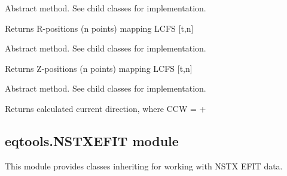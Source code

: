 \documentclass[letterpaper,10pt,english]{sphinxmanual}
\begin{document}
\begin{fulllineitems}
\begin{fulllineitems}
\end{fulllineitems}


\begin{fulllineitems}
\label{\detokenize{eqtools:eqtools.FromArrays.ArrayEquilibrium.getRLCFS}}
Abstract method.  See child classes for implementation.

Returns R-positions (n points) mapping LCFS {[}t,n{]}

\end{fulllineitems}


\begin{fulllineitems}
\label{\detokenize{eqtools:eqtools.FromArrays.ArrayEquilibrium.getZLCFS}}
Abstract method.  See child classes for implementation.

Returns Z-positions (n points) mapping LCFS {[}t,n{]}

\end{fulllineitems}


\begin{fulllineitems}
\label{\detokenize{eqtools:eqtools.FromArrays.ArrayEquilibrium.getCurrentSign}}
Abstract method.  See child classes for implementation.

Returns calculated current direction, where CCW = +

\end{fulllineitems}


\end{fulllineitems}



\subsection{eqtools.NSTXEFIT module}
\label{\detokenize{eqtools:module-eqtools.NSTXEFIT}}\label{\detokenize{eqtools:eqtools-nstxefit-module}}
This module provides classes inheriting {\hyperref[\detokenize{eqtools:eqtools.EFIT.EFITTree}]{}} for
working with NSTX EFIT data.
\end{document}
